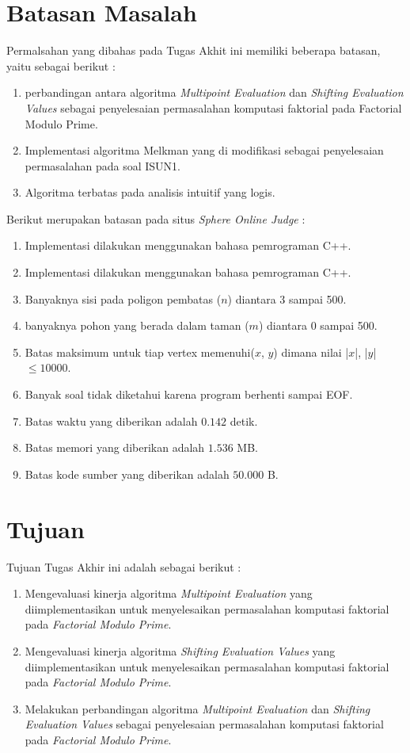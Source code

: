 \section {Batasan Masalah}
\label{sec:batasan_masalah}
Permalsahan yang dibahas pada Tugas Akhit ini memiliki beberapa batasan, yaitu sebagai berikut :
\begin{enumerate}
    \item perbandingan antara algoritma \textit{Multipoint Evaluation} dan \textit{Shifting Evaluation Values} sebagai penyelesaian permasalahan komputasi faktorial pada {Factorial Modulo Prime}.
    \item Implementasi algoritma Melkman yang di modifikasi sebagai penyelesaian permasalahan \RCH pada soal ISUN1.
    \item Algoritma \RCH terbatas pada analisis intuitif yang logis.
\end{enumerate}
Berikut merupakan batasan pada situs \textit{Sphere Online Judge} : 
\begin {enumerate}
\item Implementasi dilakukan menggunakan bahasa pemrograman C++.
    \item Implementasi dilakukan menggunakan bahasa pemrograman C++.
    \item Banyaknya sisi pada poligon pembatas ($n$) diantara 3 sampai 500.
    \item banyaknya pohon yang berada dalam taman ($m$) diantara 0 sampai 500.
    \item Batas maksimum untuk tiap vertex memenuhi($ x $, $ y $) dimana nilai |$x$|, |$y$| $\leq 10000$. 
    \item Banyak soal tidak diketahui karena program berhenti sampai EOF.
    \item Batas waktu yang diberikan adalah $ 0.142 $ detik.
    \item Batas memori yang diberikan adalah $ 1.536 $ MB.
    \item Batas kode sumber yang diberikan adalah $ 50.000 $ B. 
\end {enumerate}

\section {Tujuan}
Tujuan Tugas Akhir ini adalah sebagai berikut :
\begin{enumerate}
    \item Mengevaluasi kinerja algoritma \textit{Multipoint Evaluation} yang diimplementasikan untuk menyelesaikan permasalahan komputasi faktorial pada \textit{Factorial Modulo Prime}.
    \item Mengevaluasi kinerja algoritma \textit{Shifting Evaluation Values} yang diimplementasikan untuk menyelesaikan permasalahan komputasi faktorial pada \textit{Factorial Modulo Prime}.
    \item Melakukan perbandingan algoritma \textit{Multipoint Evaluation} dan \textit{Shifting Evaluation Values} sebagai penyelesaian permasalahan komputasi faktorial pada \textit{Factorial Modulo Prime}.
\end{enumerate}

